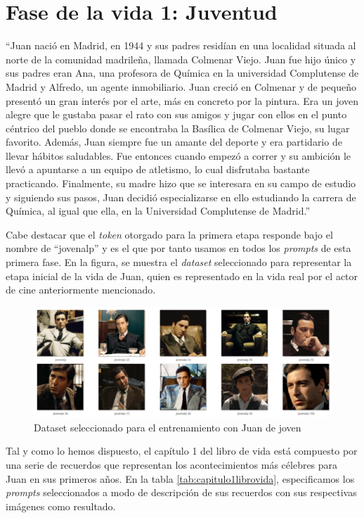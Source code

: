 \section{Fase de la vida 1: Juventud}

``Juan nació en Madrid, en 1944 y sus padres residían en una localidad situada al norte de la comunidad madrileña, llamada Colmenar Viejo. Juan fue hijo único y sus padres eran Ana, una profesora de Química en la universidad Complutense de Madrid y Alfredo, un agente inmobiliario. Juan creció en Colmenar y de pequeño presentó un gran interés por el arte, más en concreto por la pintura. Era un joven alegre que le gustaba pasar el rato con sus amigos y jugar con ellos en el punto céntrico del pueblo donde se encontraba la Basílica de Colmenar Viejo, su lugar favorito. Además, Juan siempre fue un amante del deporte y era partidario de llevar hábitos saludables. Fue entonces cuando empezó a correr y su ambición le llevó a apuntarse a un equipo de atletismo, lo cual disfrutaba bastante practicando. Finalmente, su madre hizo que se interesara en su campo de estudio y siguiendo sus pasos, Juan decidió especializarse en ello estudiando la carrera de Química, al igual que ella, en la Universidad Complutense de Madrid.'' 

Cabe destacar que el \textit{token} otorgado para la primera etapa responde bajo el nombre de ``jovenalp'' y es el que por tanto usamos en todos los \textit{prompts} de esta primera fase. En la figura, se muestra el \textit{dataset} seleccionado para representar la etapa inicial de la vida de Juan, quien es representado en la vida real por el actor de cine anteriormente mencionado. 

\begin{figure}[!htb]
	\centering
	\includegraphics[width = 1
	\textwidth]{Imagenes/Vectorial/dataset_jovenalp.png}
	\caption{Dataset seleccionado para el entrenamiento con Juan de joven}
	\label{fig:datasetjovenalp}
\end{figure}

Tal y como lo hemos dispuesto, el capítulo 1 del libro de vida está compuesto por una serie de recuerdos que representan los acontecimientos más célebres para Juan en sus primeros años. En la tabla \ref*{tab:capitulo1librovida}, especificamos los \textit{prompts} seleccionados a modo de descripción de sus recuerdos con sus respectivas imágenes como resultado. \\
 
